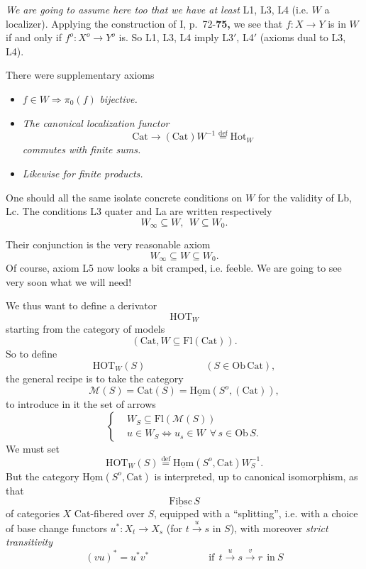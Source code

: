 \documentclass[11pt]{article}
\newcommand{\printedpage}[1]{\marginpar{\footnotesize p.~#1}}
\newcommand{\msp}[1]{\marginpar{\footnotesize [#1]}}
\newcommand{\deq}{\overset{\text{def}}{=}}
\begin{document}
\noindent\textit{We are going to assume here too that we have at least} L1, L3, L4 (i.e. $W$ a localizer). Applying the construction of I, p.~72-\textbf{75,} we see that $f : X \longrightarrow Y$ is in $W$ if and only if $f^o : X^o \longrightarrow Y^o$ is. So L1, L3, L4 imply L3$'$, L4$'$ (axioms dual to L3, L4).

\noindent There were supplementary axioms

\begin{itemize}[leftmargin=2.5em]
\item[\textbf{La}] $f \in W \Longrightarrow \pi_0(f)$ \textit{bijective.}

\item[\textbf{Lb}] \textit{The canonical localization functor}
\[
\mathrm{Cat} \longrightarrow (\mathrm{Cat})W^{-1} \deq \mathrm{Hot}_W
\]
\textit{commutes with finite sums.}

\item[\textbf{Lc}] \textit{Likewise for finite products.}
\end{itemize}

\clearpage

\noindent\printedpage{3}
One should all the same isolate concrete conditions on $W$ for the validity of Lb, Lc. The conditions L3 quater and La are written respectively
\[
W_\infty \subseteq W,\ \ W \subseteq W_0.
\]

\noindent\msp{page 3}

\noindent Their conjunction is the very reasonable axiom
\[
W_\infty \subseteq W \subseteq W_0.
\]
Of course, axiom L5 now looks a bit cramped, i.e. feeble. We are going to see very soon what we will need!

\noindent We thus want to define a derivator
\[
\mathrm{HOT}_W
\]
starting from the category of models
\[
(\mathrm{Cat}, W \subseteq \mathrm{Fl}(\mathrm{Cat})).
\]
So to define
\[
\mathrm{HOT}_W(S) \qquad\qquad\qquad (S \in \mathrm{Ob}\,\mathrm{Cat}),
\]
the general recipe is to take the category %
\[
\mathcal{M}(S) = \mathrm{Cat}(S) = \underline{\mathrm{Hom}}(S^o, (\mathrm{Cat})),
\]
to introduce in it the set of arrows
\[
\left\{
\begin{aligned}
& W_S \subseteq \mathrm{Fl}(\mathcal{M}(S)) \\
& u \in W_S \Longleftrightarrow u_s \in W \ \ \forall\, s \in \mathrm{Ob}\,S.
\end{aligned}
\right.
\]
We must set
\[
\mathrm{HOT}_W(S) \deq \underline{\mathrm{Hom}}(S^o, \mathrm{Cat})W_S^{-1}.
\]
But the category $\underline{\mathrm{Hom}}(S^o, \mathrm{Cat})$ is interpreted, up to canonical isomorphism, as that
\[
\underline{\mathrm{Fibsc}}\,S
\]
of categories $X$ Cat-fibered over $S$, equipped with a ``splitting'', i.e. with a choice of base change functors $u^* : X_t \longrightarrow X_s$ (for $t \xrightarrow{u} s$ in $S$), with moreover \textit{strict transitivity}
\[
(vu)^* = u^* v^* \qquad\qquad\qquad \text{if}\ \ t \xrightarrow{u} s \xrightarrow{v} r\ \ \text{in}\ S
\]

\noindent\msp{page 4}
\end{document}
